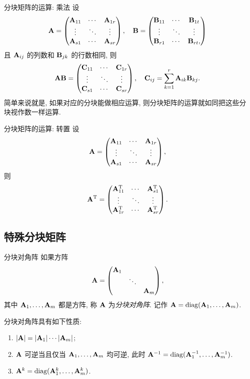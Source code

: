 \begin{frame}{分块矩阵的运算: 乘法}
	\onslide<+->
	设
	\[{\mathbf{A}}=\begin{pmatrix}
		{\mathbf{A}}_{11}&\cdots&{\mathbf{A}}_{1r}\\
		\vdots&\ddots&\vdots\\
		{\mathbf{A}}_{s1}&\cdots&{\mathbf{A}}_{sr}
	\end{pmatrix},\quad
	{\mathbf{B}}=\begin{pmatrix}
		{\mathbf{B}}_{11}&\cdots&{\mathbf{B}}_{1t}\\
		\vdots&\ddots&\vdots\\
		{\mathbf{B}}_{r1}&\cdots&{\mathbf{B}}_{rt},
	\end{pmatrix}\]
	且 ${\mathbf{A}}_{ij}$ 的列数和 ${\mathbf{B}}_{jk}$ 的行数相同, 则
	\[{\mathbf{A}}{\mathbf{B}}=\begin{pmatrix}
		{\mathbf{C}}_{11}&\cdots&{\mathbf{C}}_{1r}\\
		\vdots&\ddots&\vdots\\
		{\mathbf{C}}_{s1}&\cdots&{\mathbf{C}}_{sr}
	\end{pmatrix},\quad{\mathbf{C}}_{ij}=\sum_{k=1}^r {\mathbf{A}}_{ik}{\mathbf{B}}_{kj}.\]
	\onslide<+->
	简单来说就是, 如果对应的分块能做相应运算, 则分块矩阵的运算就如同把这些分块视作数一样运算.
\end{frame}


\begin{frame}{分块矩阵的运算: 转置}
	\onslide<+->
	设
	\[{\mathbf{A}}=\begin{pmatrix}
		{\mathbf{A}}_{11}&\cdots&{\mathbf{A}}_{1r}\\
		\vdots&\ddots&\vdots\\
		{\mathbf{A}}_{s1}&\cdots&{\mathbf{A}}_{sr}
	\end{pmatrix},\]
	则
	\[{\mathbf{A}}^{\mathrm{T}}=\begin{pmatrix}
		{\mathbf{A}}_{11}^{\mathrm{T}}&\cdots&{\mathbf{A}}_{s1}^{\mathrm{T}}\\
		\vdots&\ddots&\vdots\\
		{\mathbf{A}}_{1r}^{\mathrm{T}}&\cdots&{\mathbf{A}}_{sr}^{\mathrm{T}}
	\end{pmatrix}.\]
\end{frame}


\subsection{特殊分块矩阵}
\begin{frame}{分块对角阵}
	\onslide<+->
	如果方阵
	\[{\mathbf{A}}=\begin{pmatrix}
		{\mathbf{A}}_1&&\\
		&\ddots&\\
		&&{\mathbf{A}}_m
	\end{pmatrix},\]
	其中 ${\mathbf{A}}_1,\dots,{\mathbf{A}}_m$ 都是方阵,
	\onslide<+->
	称 ${\mathbf{A}}$ 为\emph{分块对角阵}.
	\onslide<+->
	记作 ${\mathbf{A}}={\mathrm{diag}}({\mathbf{A}}_1,\dots,{\mathbf{A}}_m)$.

	\onslide<+->
	分块对角阵具有如下性质:
	\begin{enumerate}
		\item $|{\mathbf{A}}|=|{\mathbf{A}}_1|\cdots|{\mathbf{A}}_m|$;
		\item ${\mathbf{A}}$ 可逆当且仅当 ${\mathbf{A}}_1,\dots,{\mathbf{A}}_m$ 均可逆, 此时
		${\mathbf{A}}^{-1}={\mathrm{diag}}({\mathbf{A}}_1^{-1},\dots,{\mathbf{A}}_m^{-1})$.
		\item ${\mathbf{A}}^k={\mathrm{diag}}({\mathbf{A}}_1^k,\dots,{\mathbf{A}}_m^k)$.
	\end{enumerate}
\end{frame}


